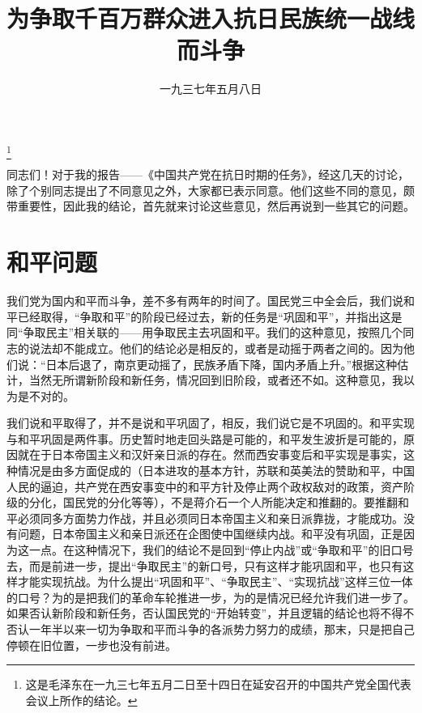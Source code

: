 
\title{为争取千百万群众进入抗日民族统一战线而斗争}
\date{一九三七年五月八日}
\thanks{这是毛泽东在一九三七年五月二日至十四日在延安召开的中国共产党全国代表会议上所作的结论。}
\maketitle


同志们！对于我的报告——《中国共产党在抗日时期的任务》，经这几天的讨论，除了个别同志提出了不同意见之外，大家都已表示同意。他们这些不同的意见，颇带重要性，因此我的结论，首先就来讨论这些意见，然后再说到一些其它的问题。

\section{和平问题}

我们党为国内和平而斗争，差不多有两年的时间了。国民党三中全会后，我们说和平已经取得，“争取和平”的阶段已经过去，新的任务是“巩固和平”，并指出这是同“争取民主”相关联的——用争取民主去巩固和平。我们的这种意见，按照几个同志的说法却不能成立。他们的结论必是相反的，或者是动摇于两者之间的。因为他们说：“日本后退了，南京更动摇了，民族矛盾下降，国内矛盾上升。”根据这种估计，当然无所谓新阶段和新任务，情况回到旧阶段，或者还不如。这种意见，我以为是不对的。

我们说和平取得了，并不是说和平巩固了，相反，我们说它是不巩固的。和平实现与和平巩固是两件事。历史暂时地走回头路是可能的，和平发生波折是可能的，原因就在于日本帝国主义和汉奸亲日派的存在。然而西安事变后和平实现是事实，这种情况是由多方面促成的（日本进攻的基本方针，苏联和英美法的赞助和平，中国人民的逼迫，共产党在西安事变中的和平方针及停止两个政权敌对的政策，资产阶级的分化，国民党的分化等等），不是蒋介石一个人所能决定和推翻的。要推翻和平必须同多方面势力作战，并且必须同日本帝国主义和亲日派靠拢，才能成功。没有问题，日本帝国主义和亲日派还在企图使中国继续内战。和平没有巩固，正是因为这一点。在这种情况下，我们的结论不是回到“停止内战”或“争取和平”的旧口号去，而是前进一步，提出“争取民主”的新口号，只有这样才能巩固和平，也只有这样才能实现抗战。为什么提出“巩固和平”、“争取民主”、“实现抗战”这样三位一体的口号？为的是把我们的革命车轮推进一步，为的是情况已经允许我们进一步了。如果否认新阶段和新任务，否认国民党的“开始转变”，并且逻辑的结论也将不得不否认一年半以来一切为争取和平而斗争的各派势力努力的成绩，那末，只是把自己停顿在旧位置，一步也没有前进。

